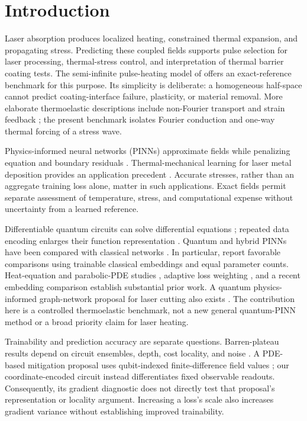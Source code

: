 \documentclass[11pt]{article}
\begin{document}
\section{Introduction}

Laser absorption produces localized heating, constrained thermal expansion,
and propagating stress. Predicting these coupled fields supports pulse
selection for laser processing, thermal-stress control, and interpretation
of thermal barrier coating tests. The semi-infinite pulse-heating model of
\citet{AlQahtani2026} offers an exact-reference benchmark for this purpose.
Its simplicity is deliberate: a homogeneous half-space cannot predict
coating-interface failure, plasticity, or material removal. More elaborate
thermoelastic descriptions include non-Fourier transport and strain
feedback \citep{WangXu2001}; the present benchmark isolates Fourier
conduction and one-way thermal forcing of a stress wave.

Physics-informed neural networks (PINNs) approximate fields while penalizing
equation and boundary residuals \citep{Raissi2019}. Thermal-mechanical
learning for laser metal deposition provides an application precedent
\citep{Sharma2024}. Accurate stresses, rather than an aggregate training
loss alone, matter in such applications. Exact fields permit separate
assessment of temperature, stress, and computational expense without
uncertainty from a learned reference.

Differentiable quantum circuits can solve differential equations
\citep{Kyriienko2021}; repeated data encoding enlarges their function
representation \citep{PerezSalinas2020}. Quantum and hybrid PINNs have been
compared with classical networks \citep{Trahan2024}. In particular,
\citet{Berger2025} report favorable comparisons using trainable classical
embeddings and equal parameter counts. Heat-equation and parabolic-PDE
studies \citep{Dehaghani2025,Tran2026}, adaptive loss weighting
\citep{Setty2025}, and a recent embedding comparison
\citep{TranEmbedding2026} establish substantial prior work. A quantum
physics-informed graph-network proposal for laser cutting also exists
\citep{Ruhi2023}. The contribution here is a controlled thermoelastic
benchmark, not a new general quantum-PINN method or a broad priority claim
for laser heating.

Trainability and prediction accuracy are separate questions. Barren-plateau
results depend on circuit ensembles, depth, cost locality, and noise
\citep{McClean2018,Cerezo2021,WangNoise2021}. A PDE-based mitigation proposal
uses qubit-indexed finite-difference field values \citep{Ukwatta2026}; our
coordinate-encoded circuit instead differentiates fixed observable
readouts. Consequently, its gradient diagnostic does not directly test
that proposal's representation or locality argument. Increasing a loss's
scale also increases gradient variance without establishing improved
trainability.
\end{document}
